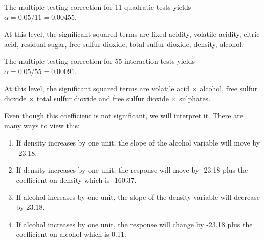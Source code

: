 \documentclass[12pt]{article}
\begin{document}
\begin{enumerate}



The multiple testing correction for 11 quadratic tests yields $\alpha = 0.05 / 11 = 0.00455$. 

At this level, the significant squared terms are fixed acidity, volatile acidity, citric acid, residual sugar, free sulfur dioxide, total sulfur dioxide, density, alcohol.


The multiple testing correction for 55 interaction tests yields $\alpha = 0.05 / 55 = 0.00091$.

At this level, the significant squared terms are volatile acid $\times$ alcohol, free sulfur dioxide $\times$ total sulfur dioxide and free sulfur dioxide $\times$ sulphates.
 


Even though this coefficient is not significant, we will interpret it. There are many ways to view this:

\begin{enumerate}
\item If density increases by one unit, the slope of the alcohol variable will move by -23.18.
\item If density increases by one unit, the response will move by -23.18 plus the coefficient on density which is -160.37.
\item If alcohol increases by one unit, the slope of the density variable will decrease by 23.18.
\item If alcohol increases by one unit, the response will change by -23.18 plus the coefficient on alcohol which is 0.11.
\end{enumerate}


\end{enumerate}
\end{document}
